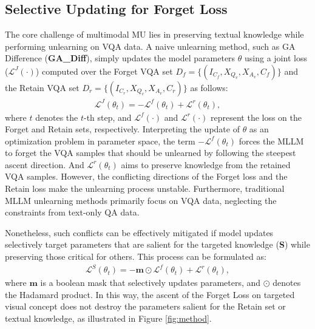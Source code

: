 \subsection{Selective Updating for Forget Loss}\label{sec:floss}
The core challenge of multimodal MU lies in preserving textual knowledge while performing unlearning on VQA data. A naive unlearning method, such as GA Difference (\textbf{GA\_Diff}), simply updates the model parameters $\theta$ using a joint loss ($\mathcal{L}^J(\cdot)$) computed over the Forget VQA set $D_f=\{(I_{C_f}, X_{Q_v}, X_{A_v}, C_f)\}$ and the Retain VQA set $D_r=\{(I_{C_r}, X_{Q_v}, X_{A_v}, C_r)\}$ as follows:
\begin{equation}
\begin{split}
\mathcal{L}^J(\theta_t) = -\mathcal{L}^{f}(\theta_t) + \mathcal{L}^{r}(\theta_t),
\end{split}
\end{equation}
where $t$ denotes the $t$-th step, and $\mathcal{L}^{f}(\cdot)$ and $\mathcal{L}^{r}(\cdot)$ represent the loss on the Forget and Retain sets, respectively. Interpreting the update of $\theta$ as an optimization problem in parameter space, the term $-\mathcal{L}^{f}(\theta_t)$ forces the MLLM to forget the VQA samples that should be unlearned by following the steepest ascent direction. And $\mathcal{L}^{r}(\theta_t)$ aims to preserve knowledge from the retained VQA samples. However, the conflicting directions of the Forget loss and the Retain loss make the unlearning process unstable. Furthermore, traditional MLLM unlearning methods primarily focus on VQA data, neglecting the constraints from text-only QA data.\par

Nonetheless, such conflicts can be effectively mitigated if model updates selectively target parameters that are salient for the targeted knowledge (\textbf{S}) while preserving those critical for others. This process can be formulated as:
\begin{equation}
\begin{split}
\mathcal{L}^S(\theta_t) = -\mathbf{m} \odot \mathcal{L}^{f}(\theta_t) + \mathcal{L}^{r}(\theta_t),
\end{split}
\end{equation}
where $\mathbf{m}$ is a boolean mask that selectively updates parameters, and $\odot$ denotes the Hadamard product. In this way, the ascent of the Forget Loss on targeted visual concept does not destroy the parameters salient for the Retain set or textual knowledge, as illustrated in Figure \ref{fig:method}.

